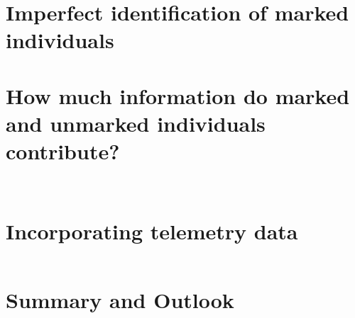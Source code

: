 \begin{table}[ht]
\label{partialID.tab.unknownsim}
\centering
   \begin{tabular}{lccccc}
  \end{tabular}
\end{table}


\section  {Imperfect identification of marked individuals}
\label{partialID.sec.IDrate}


\section{How much information do marked and unmarked individuals contribute?}
\label{partialID.sec.info}

\begin{figure}[ht]
  \centering
  \label{partialID.fig.nposts}
\end{figure}


\begin{table}[ht]
\centering
\begin{tabular}{llrrrrr}
 \end{tabular}
\label{partialID.tab.sim}
\end{table}

\begin{table}[ht]
\centering
\begin{tabular}{llrrrrr}
\end{tabular}
\label{partialID.tab.sim2}
\end{table}


\section{Incorporating telemetry data}
\label{partialID.sec.telemetry}

\begin{figure}[ht]
  \centering
  \label{partialID.fig.raccoon}
\end{figure}


\begin{table}%
\centering
\begin{tabular}{lrrrrr}
\end{tabular}
\label{partialID.tab.raccoons}
\end{table}


\section{Summary and Outlook}




 
